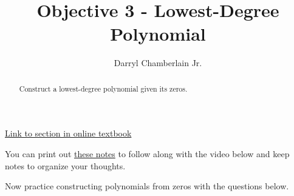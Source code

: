 \documentclass{ximera}
\author{Darryl Chamberlain Jr.}
\title{Objective 3 - Lowest-Degree Polynomial}
\begin{document}
\begin{abstract}
Construct a lowest-degree polynomial given its zeros.
\end{abstract}
\maketitle

\href{https://cnx.org/contents/mwjClAV_@8.1:G7V9LHif@17/Zeros-of-Polynomial-Functions}{Link to section in online textbook}


You can print out \href{http://people.clas.ufl.edu/dchamberlain31/files/M6-Objective-3-Construct-Polynomials.pdf}{these notes} to follow along with the video below and keep notes to organize your thoughts.


Now practice constructing polynomials from zeros with the questions below.
\end{document}
